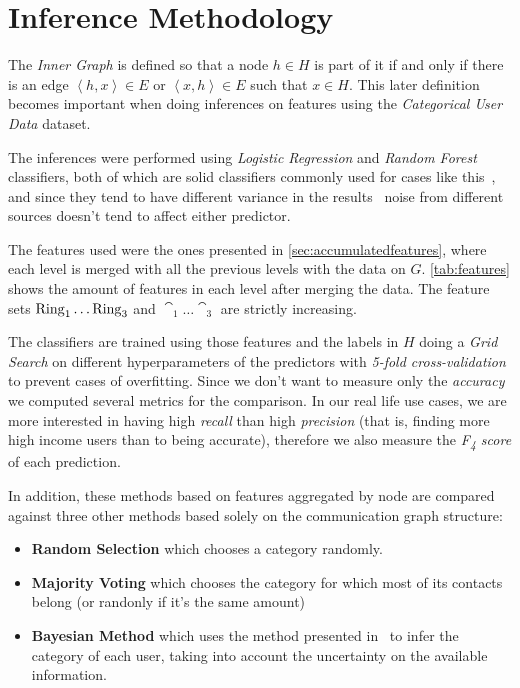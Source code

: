 \section{Inference Methodology}
\label{sec:inference_methodology}

The \emph{Inner Graph} is defined so that a node $h \in H$ is part of it if and only if there is an edge $\left< h, x \right> \in E$ or $\left< x, h \right> \in E$ such that $x \in H$.
This later definition becomes important when doing inferences on features using the \emph{Categorical User Data} dataset.


The inferences were performed using \emph{Logistic Regression} and \emph{Random Forest} classifiers, both of which are solid classifiers commonly used for cases like this~\cite{binaryevaluation}, and since they tend to have different variance in the results~\cite{ting2016} noise from different sources doesn't tend to affect either predictor.

The features used were the ones presented in \cref{sec:accumulatedfeatures}, where each level is merged with all the previous levels with the data on $G$. \cref{tab:features} shows the amount of features in each level after merging the data. 
The feature sets $\operatorname{Ring}_1 \ldots \operatorname{Ring}_3$ and $\cat_1 \ldots \cat_3$ are strictly
increasing.

The classifiers are trained using those features and the labels in $H$ doing a \emph{Grid Search} on different hyperparameters of the predictors with \emph{5-fold cross-validation} to prevent cases of overfitting. Since we don't want to measure only the \emph{accuracy} we computed several metrics for the comparison. In our real life use cases, we are more interested in having high \emph{recall} than high \emph{precision} (that is, finding more high income users than to being accurate), therefore we also measure the \emph{F\textsubscript{4} score} of each prediction.

In addition, these methods based on features aggregated by node are compared against three other methods based solely on the communication graph structure:

\begin{itemize}
	\item \textbf{Random Selection} which chooses a category randomly.
	\item \textbf{Majority Voting} which chooses the category for which most of its contacts belong (or randonly if it's the same amount)
	\item \textbf{Bayesian Method} which uses the method presented in~\cite{fixmanasonam2016} to infer the category of each user,
	taking into account the uncertainty on the available information.
\end{itemize}
